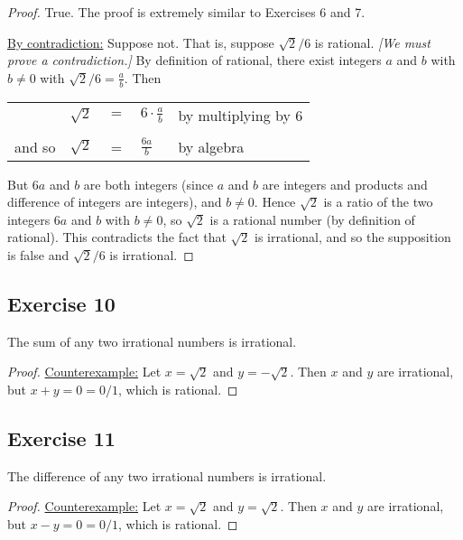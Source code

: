 \documentclass[14pt]{extarticle}
\newcommand{\dps}{\displaystyle}
\newcommand{\cy}{\color{cyan}}
\begin{document}
\begin{proof}
    True. The proof is extremely similar to Exercises 6 and 7.

    \underline{By contradiction:} Suppose not. That is, suppose
    $\sqrt{2}/6$ is rational. {\it [We must prove a contradiction.]} By definition of rational, there exist integers $a$ and $b$ with $b \neq 0$ with $\sqrt{2}/6 = \frac{a}{b}$. Then

    \begin{center}
        \begin{tabular}{lrcll}
                   & $\sqrt{2}$ & $=$ & $\dps 6 \cdot\frac{a}{b}$ & {\cy by multiplying by 6} \\
            \\
            and so & $\sqrt{2}$ & =   & $\dps\frac{6a}{b}$        & {\cy by algebra}          \\
        \end{tabular}
    \end{center}

    But $6a$ and $b$ are both integers (since $a$ and $b$ are integers and products and difference of integers are integers), and $b \neq 0$. Hence $\sqrt{2}$ is a ratio of the two integers $6a$ and $b$ with $b \neq 0$, so $\sqrt{2}$ is a rational number (by definition of rational). This contradicts the fact that $\sqrt{2}$ is irrational, and so the supposition is false and $\sqrt{2}/6$ is irrational.
\end{proof}

\subsection{Exercise 10}
The sum of any two irrational numbers is irrational.

\begin{proof}
    \underline{Counterexample:} Let $x = \sqrt{2}$ and $y = -\sqrt{2}$. Then $x$ and $y$ are irrational, but $x + y = 0  = 0/1$, which is rational.
\end{proof}

\subsection{Exercise 11}
The difference of any two irrational numbers is irrational.

\begin{proof}
    \underline{Counterexample:} Let $x = \sqrt{2}$ and $y = \sqrt{2}$. Then $x$ and $y$ are irrational, but $x - y = 0  = 0/1$, which is rational.
\end{proof}
\end{document}
